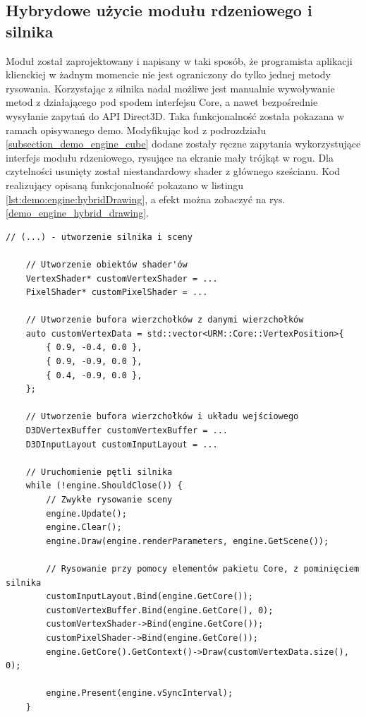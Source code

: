\subsection{Hybrydowe użycie modułu rdzeniowego i silnika}
Moduł został zaprojektowany i napisany w taki sposób, że programista aplikacji klienckiej w żadnym momencie nie jest ograniczony do tylko jednej metody rysowania. Korzystając z silnika nadal możliwe jest manualnie wywoływanie metod z działającego pod spodem interfejsu Core, a nawet bezpośrednie wysyłanie zapytań do API Direct3D. Taka funkcjonalność została pokazana w ramach opisywanego demo. Modyfikując kod z podrozdziału \ref{subsection_demo_engine_cube} dodane zostały ręczne zapytania wykorzystujące interfejs modułu rdzeniowego, rysujące na ekranie mały trójkąt w rogu. Dla czytelności usunięty został niestandardowy shader z głównego sześcianu. Kod realizujący opisaną funkcjonalność pokazano w listingu \ref{lst:demo:engine:hybridDrawing}, a efekt można zobaczyć na rys. \ref{demo_engine_hybrid_drawing}.

\vfill
\clearpage

\begin{lstlisting}[caption={Fragmentu kodu dema, który pokazuje możliwość hybrydowego użycia interfejsów różnych warstw modułu.}, label={lst:demo:engine:hybridDrawing}]
	// (...) - utworzenie silnika i sceny
	
	// Utworzenie obiektów shader'ów
	VertexShader* customVertexShader = ...
	PixelShader* customPixelShader = ...
	
	// Utworzenie bufora wierzchołków z danymi wierzchołków
	auto customVertexData = std::vector<URM::Core::VertexPosition>{
		{ 0.9, -0.4, 0.0 },
		{ 0.9, -0.9, 0.0 },
		{ 0.4, -0.9, 0.0 },
	};
	
	// Utworzenie bufora wierzchołków i układu wejściowego
	D3DVertexBuffer customVertexBuffer = ...
	D3DInputLayout customInputLayout = ...
	
	// Uruchomienie pętli silnika
	while (!engine.ShouldClose()) {
		// Zwykłe rysowanie sceny
		engine.Update();
		engine.Clear();
		engine.Draw(engine.renderParameters, engine.GetScene());
		
		// Rysowanie przy pomocy elementów pakietu Core, z pominięciem silnika
		customInputLayout.Bind(engine.GetCore());
		customVertexBuffer.Bind(engine.GetCore(), 0);
		customVertexShader->Bind(engine.GetCore());
		customPixelShader->Bind(engine.GetCore());
		engine.GetCore().GetContext()->Draw(customVertexData.size(), 0);
		
		engine.Present(engine.vSyncInterval);
	}
\end{lstlisting}

